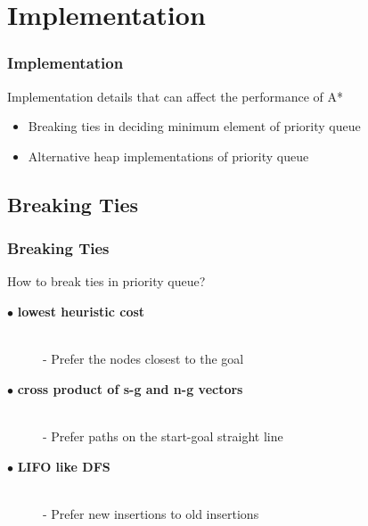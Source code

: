 \documentclass[14pt]{beamer}
\begin{document}
\section{Implementation}
\begin{frame}
	\frametitle{Implementation}
	\begin{tcolorbox}[width=\textwidth, height=0.3\textheight]
		\large
		Implementation details that can affect the performance of A*
	\end{tcolorbox}
	\begin{itemize}
		\item Breaking ties in deciding minimum element of priority queue
		\pause
		\item Alternative heap implementations of priority queue
	\end{itemize}
\end{frame}	

\subsection{Breaking Ties}
\begin{frame}
	\frametitle{Breaking Ties}
	\begin{tcolorbox}[width=\textwidth, height=0.2\textheight]
		\large
		How to break ties in priority queue?
	\end{tcolorbox}
	\begin{description}
		\item[$\bullet$ \bfseries{lowest heuristic cost}] \hfill \\ - Prefer the nodes closest to the goal
		\pause
		\item[$\bullet$ \bfseries{cross product of s-g and n-g vectors}] \hfill \\ - Prefer paths on the start-goal straight line 
		\pause
		\item[$\bullet$ \bfseries{LIFO like DFS}] \hfill \\ - Prefer new insertions to old insertions 
	\end{description}
\end{frame}
\end{document}
